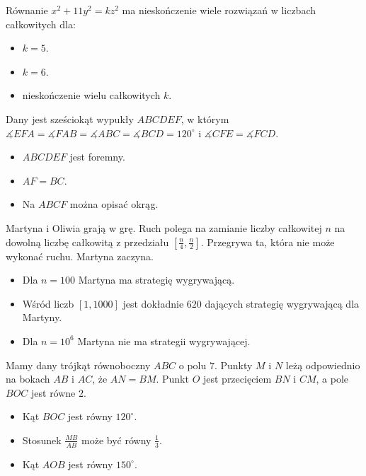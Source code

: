 \documentclass[12pt, a4paper]{article}
\newcommand{\question}[1]{\normalitem \begin{samepage}#1 \end{samepage}}
\newcommand{\questionwithasterix}[1]{ \asterixitem \begin{samepage}#1 \vspace{6cm}\end{samepage}}
\newcommand{\cmark}{\textcolor{green}{T}}%
\newcommand{\xmark}{\textcolor{red}{N}}%
\newcommand{\yes}{\rlap{\framebox(15,15)} {\raisebox{2pt}{\large\hspace{-1pt}\cmark}}%
\hspace{3pt}}
\newcommand{\no}{\rlap{\framebox(15,15)} {\raisebox{2pt}{\large\hspace{-1pt}\xmark}}%
\hspace{3pt}}
\begin{document}
\begin{enumerate}
	\questionwithasterix {
		Równanie $x^2+11y^2=kz^2$ ma nieskończenie wiele rozwiązań w liczbach całkowitych dla:
	
		\begin{itemize}
			\item [\yes]$k=5$.
			\item [\no]$k=6$.
			\item [\yes]nieskończenie wielu całkowitych $k$.
		\end{itemize}
	}
	
	\question{
		Dany jest sześciokąt wypukły $ABCDEF$, w którym $\measuredangle  EFA = \measuredangle FAB = \measuredangle ABC = \measuredangle BCD = 120^{\circ}$ i $\measuredangle CFE = \measuredangle FCD$.
	
		\begin{itemize}
			\item [\no]$ABCDEF$ jest foremny.
			\item [\yes]$AF = BC$.
			\item [\yes]Na $ABCF$ można opisać okrąg.
		\end{itemize}
	}
	
	\question{
		 Martyna i Oliwia grają w grę. Ruch polega na zamianie liczby całkowitej $n$ na dowolną liczbę całkowitą z przedziału $[\frac{n}{4},\frac{n}{2}]$. Przegrywa ta, która nie może wykonać ruchu. Martyna zaczyna.
	
		\begin{itemize}
			\item [\yes]Dla $n=100$ Martyna ma strategię wygrywającą.
			\item [\no]Wśród liczb $[1,1000]$ jest dokładnie $620$ dających strategię wygrywającą dla Martyny.
			\item [\no]Dla $n=10^6$ Martyna nie ma strategii wygrywającej.
		\end{itemize}
	}
	
	\question{
		Mamy dany trójkąt równoboczny $ABC$ o polu $7$. Punkty $M$ i $N$ leżą odpowiednio na bokach $AB$ i $AC$, że $AN=BM$. Punkt $O$ jest przecięciem $BN$ i $CM$, a pole $BOC$ jest równe $2$.
	
		\begin{itemize}
			\item [\yes]Kąt $BOC$ jest równy $120^{\circ}$.
			\item [\yes]Stosunek $\frac {MB}{AB}$ może być równy $\frac{1}{3}$.
			\item [\no]Kąt $AOB$ jest równy $150^{\circ}$.
		\end{itemize}
	}
	

\end{enumerate}
\end{document}
